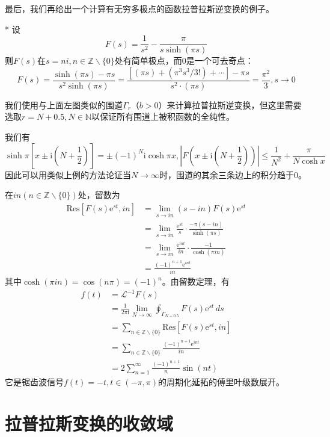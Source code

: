 \documentclass{ctexbook}
\begin{document}
最后，我们再给出一个计算有无穷多极点的函数拉普拉斯逆变换的例子\cite{folland}。
\begin{example}*
    设\[F(s)=\frac{1}{s^2}-\frac{\pi}{s\sinh(\pi s)}\]
    则$F(s)$在$s=ni,n\in\mathbb{Z}\backslash\{0\}$处有简单极点，而0是一个可去奇点：\[F(s)=\frac{\sinh(\pi s)-\pi s}{s^2 \sinh(\pi s)}=\frac{[(\pi s)+(\pi^3s^3/3!)+\cdots]-\pi s}{s^2 \cdot(\pi s)}=\frac{\pi^2}{3},s\to 0\]

    我们使用与上面左图类似的围道$\Gamma_r$（$b>0$）来计算拉普拉斯逆变换，但这里需要选取$r=N+0.5,N\in\mathbb{N} $以保证所有围道上被积函数的全纯性。

    我们有\[\sinh\pi\left[x\pm \mathrm{i}\left(N+\frac{1}{2}\right)\right]=\pm(-1)^N \mathrm{i}\cosh\pi x,\left|F\left(x\pm \mathrm{i}\left(N+\frac{1}{2}\right)\right)\right|\leq \frac{1}{N^2}+\frac{\pi}{N\cosh x}\]
    因此可以用类似上例的方法论证当$N\to\infty$时，围道的其余三条边上的积分趋于0。

    在$in(n\in\mathbb{Z}\backslash\{0\})$处，留数为
    \begin{align*}
        \text{Res}[F(s)\mathrm{e}^{st},in]&=\lim_{s\to in}(s-in)F(s)\mathrm{e}^{st}\\
        &=\lim_{s\to in}\frac{\mathrm{e}^{st}}{s}\cdot\frac{-\pi(s-in)}{\sinh(\pi s)}\\
        &=\lim_{s\to in}\frac{\mathrm{e}^{int}}{in}\cdot\frac{-1}{\cosh(\pi in)}\\
        &=\frac{(-1)^{n+1}\mathrm{e}^{int}}{in}
    \end{align*}
    其中$\cosh(\pi in)=\cos(n\pi)=(-1)^n$。由留数定理，有
    \begin{align*}
        f(t)&=\mathcal{L}^{-1} F(s)\\
        &=\frac{1}{2\pi \mathrm{i}}\lim_{N\to\infty}\oint_{\Gamma_{N+0.5}}F(s)\mathrm{e}^{st}\,ds\\
        &=\sum_{n\in\mathbb{Z}\backslash\{0\}}\text{Res}[F(s)\mathrm{e}^{st},in]\\
        &=\sum_{n\in\mathbb{Z}\backslash\{0\}}\frac{(-1)^{n+1}\mathrm{e}^{int}}{in}\\
        &=2\sum_{n=1}^{\infty}\frac{(-1)^{n+1}}{n}\sin(nt)
    \end{align*}
    它是锯齿波信号$f(t)=-t,t\in(-\pi,\pi)$的周期化延拓的傅里叶级数展开。
\end{example}

\section{拉普拉斯变换的收敛域}\label{Convergence}
\end{document}
